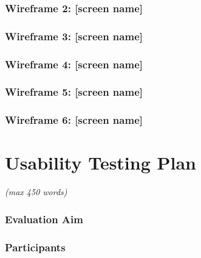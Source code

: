 \documentclass[a4paper,11pt]{article}
\newcommand{\wclimit}[1]{\hfill\textit{\footnotesize(max #1 words)}}
\begin{document}
\newpage
\subsubsection*{Wireframe 2: [screen name]}

\newpage
\subsubsection*{Wireframe 3: [screen name]}

\newpage
\subsubsection*{Wireframe 4: [screen name]}

\newpage
\subsubsection*{Wireframe 5: [screen name]}

\newpage
\subsubsection*{Wireframe 6: [screen name]}

\newpage
\section{Usability Testing Plan}\label{sec:usability}
\wclimit{450}

\subsubsection*{Evaluation Aim}
\subsubsection*{Participants}
\end{document}
